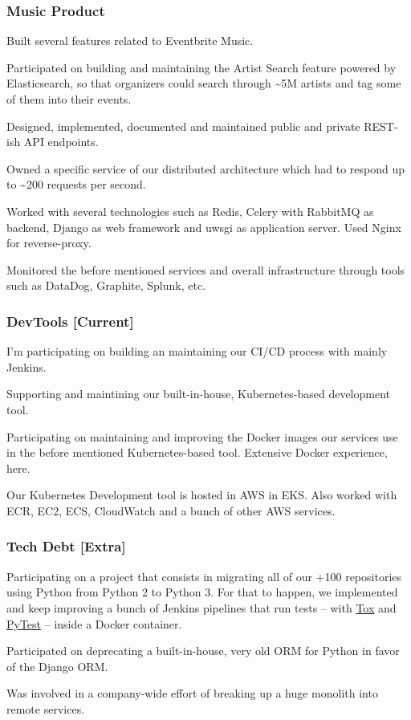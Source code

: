 \documentclass{article}
\begin{document}
\subsubsection{Music Product}
  \begin{description}
    \item Built several features related to Eventbrite Music.
    \item Participated on building and maintaining the Artist Search feature powered by Elasticsearch, so that organizers could search through \textasciitilde5M artists and tag some of them into their events.
    \item Designed, implemented, documented and maintained public and private REST-ish API endpoints.
    \item Owned a specific service of our distributed architecture which had to respond up to \textasciitilde200 requests per second.
    \item Worked with several technologies such as Redis, Celery with RabbitMQ as backend, Django as web framework and uwsgi as application server. Used Nginx for reverse-proxy.
    \item Monitored the before mentioned services and overall infrastructure through tools such as DataDog, Graphite, Splunk, etc.
  \end{description}
\subsubsection{DevTools [Current]}
  \begin{description}
    \item I'm participating on building an maintaining our CI/CD process with mainly Jenkins.
    \item Supporting and maintining our built-in-house, Kubernetes-based development tool.
    \item Participating on maintaining and improving the Docker images our services use in the before mentioned Kubernetes-based tool. Extensive Docker experience, here.
    \item Our Kubernetes Development tool is hosted in AWS in EKS. Also worked with ECR, EC2, ECS, CloudWatch and a bunch of other AWS services.
  \end{description}
\subsubsection{Tech Debt [Extra]}
  \begin{description}
    \item Participating on a project that consists in migrating all of our +100 repositories using Python from Python 2 to Python 3.
      For that to happen, we implemented and keep improving a bunch of Jenkins pipelines that run tests – with \href{https://tox.readthedocs.io/en/latest/}{Tox} and \href{https://docs.pytest.org/en/latest/}{PyTest} – inside a Docker container.
    \item Participated on deprecating a built-in-house, very old ORM for Python in favor of the Django ORM.
    \item Was involved in a company-wide effort of breaking up a huge monolith into remote services.
  \end{description}
\end{document}
